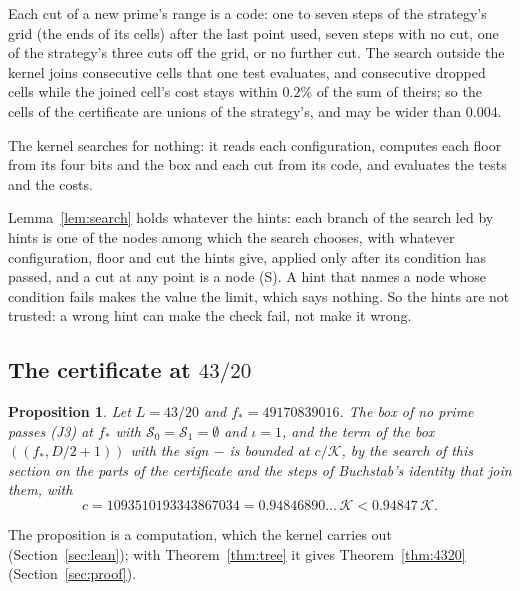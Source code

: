 \documentclass[11pt]{article}
\newtheorem{proposition}[theorem]{Proposition}
\theoremstyle{definition}
\begin{document}
Each cut of a new prime's range is a code: one to seven steps of the strategy's grid (the ends of its cells) after
the last point used, seven steps with no cut, one of the strategy's three cuts off the grid, or no further cut. The
search outside the kernel joins consecutive cells that one test evaluates, and consecutive dropped cells while the
joined cell's cost stays within $0.2\%$ of the sum of theirs; so the cells of the certificate are unions of the
strategy's, and may be wider than $0.004$.

The kernel searches for nothing: it reads each configuration, computes each floor from its four bits and
the box and each cut from its code, and evaluates the tests and the costs.

Lemma~\ref{lem:search} holds whatever the hints: each branch of the search led by hints is one of the nodes among which
the search chooses, with whatever configuration, floor and cut the hints give, applied only after its condition has
passed, and a cut at any point is a node (S). A hint that names a node whose condition fails makes the value the
limit, which says nothing. So the hints are not trusted: a wrong hint can make the check fail, not make it wrong.

\subsection{The certificate at \texorpdfstring{$43/20$}{43/20}}

\begin{proposition}\label{prop:certificate}
Let $L = 43/20$ and $f_* = 49170839016$. The box of no prime passes (J3) at $f_*$ with $\mathcal S_0 = \mathcal S_1 =
\emptyset$ and $\iota = 1$, and the term of the box $((f_*, D/2 + 1))$ with the sign $-$ is bounded at $c/\mathcal K$,
by the search of this section on the parts of the certificate and the steps of Buchstab's identity that join them,
with
\[
  c = 1093510193343867034 = 0.94846890\ldots\, \mathcal K < 0.94847\, \mathcal K.
\]
\end{proposition}

The proposition is a computation, which the kernel carries out (Section~\ref{sec:lean}); with Theorem~\ref{thm:tree} it
gives Theorem~\ref{thm:4320} (Section~\ref{sec:proof}).
\end{document}
